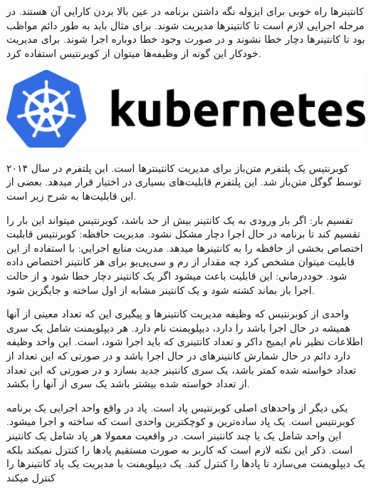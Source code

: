 \documentclass[a4]{report}
\begin{document}

کانتینرها راه خوبی برای ایزوله نگه داشتن برنامه در عین بالا بردن کارایی آن هستند. در مرحله اجرایی لازم است تا
کانتینر‌ها مدیریت شوند. برای مثال باید به طور دائم مواظب بود تا کانتینرها دچار خطا نشوند و در صورت وجود
خطا دوباره اجرا شوند. برای مدیریت خودکار این گونه از وظیفه‌ها میتوان از کوبرنتیس استفاده کرد.

\includegraphics[scale=0.5]{fig/kubernetes}

کوبرنتیس یک پلتفرم متن‌باز برای مدیریت کانتینتر‌ها است. این پلتفرم در سال ۲۰۱۴ توسط گوگل متن‌باز
شد. این پلتفرم قابلیت‌های بسیاری در اختیار قرار میدهد. بعضی از این قابلیت‌ها به شرح زیر است.

 تقسیم بار: اگر بار ورودی به یک کانتینر بیش از حد باشد، کوبرنتیس میتواند این بار را تقسیم کند
تا برنامه در حال اجرا دچار مشکل نشود.
 مدیریت حافظه: کوبرنتیس قابلیت اختصاص بخشی از حافظه را به کانتینر‌ها میدهد.
 مدریت منابع اجرایي: با استفاده از این قابلیت میتوان مشخص کرد چه مقدار از رم و سی‌پی‌یو برای هر کانتینر اختصاص داده شود.
 خود‌درماني: این قابلیت باعث میشود اگر یک کانتینر دچار خطا شود و از حالت اجرا باز بماند کشته
شود و یک کانتینر مشابه از اول ساخته و جایگزین شود.

واحدی از کوبرنتیس که وظیفه مدیریت کانتینر‌ها و پیگیری این که تعداد معینی از آنها همیشه در حال اجرا باشد را دارد، دیپلویمنت نام دارد. هر دیپلویمنت شامل یک سری اطلاعات نظیر نام ایمیج داکر و تعداد کانتینری که باید اجرا شود، است. این واحد وظیفه دارد دائم در حال شمارش کانتینر‌های در حال اجرا باشد و در صورتی که این تعداد از تعداد خواسته شده کمتر باشد، یک سری کانتینر جدید بسازد و در صورتی که این تعداد از تعداد خواسته شده بیشتر باشد یک سری از آنها را بکشد.

یکی دیگر از واحدهای اصلی کوبرنتیس پاد است. پاد در واقع واحد اجرایی یک برنامه کوبرنتیس است. یک
پاد ساده‌ترین و کوچکترین واحدی است که ساخته و اجرا میشود. این واحد شامل یک یا چند کانتینر است.
در واقعیت معمولا هر پاد شامل یک کانتینر است. ذکر این نکته لازم است که کاربر به صورت مستقیم پاد‌ها را
کنترل نمیکند بلکه یک دیپلویمنت می‌سازد تا پادها را کنترل کند. یک دیپلویمنت با مدیریت یک پاد
کانتینر‌ها را کنترل میکند
\end{document}
